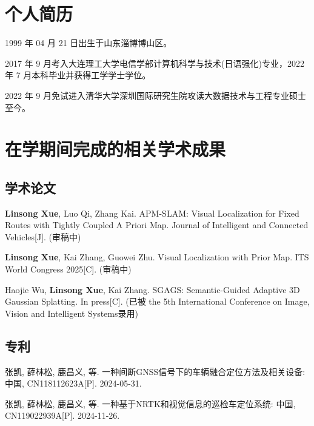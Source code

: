 
\begin{resume}

  \section*{个人简历}

  1999 年 04 月 21 日出生于山东淄博博山区。

  2017 年 9 月考入大连理工大学电信学部计算机科学与技术(日语强化)专业，2022 年 7 月本科毕业并获得工学学士学位。

  2022 年 9 月免试进入清华大学深圳国际研究生院攻读大数据技术与工程专业硕士至今。


  \section*{在学期间完成的相关学术成果}

  \subsection*{学术论文}

  \begin{achievements}
    \item \textbf{Linsong Xue}, Luo Qi, Zhang Kai. APM-SLAM: Visual Localization for Fixed Routes with Tightly Coupled A Priori Map. Journal of Intelligent and Connected Vehicles[J]. (审稿中)
    \item \textbf{Linsong Xue}, Kai Zhang, Guowei Zhu. Visual Localization with Prior Map. ITS World Congress 2025[C]. (审稿中)
    \item Haojie Wu, \textbf{Linsong Xue}, Kai Zhang. SGAGS: Semantic-Guided Adaptive 3D Gaussian Splatting. In press[C]. (已被 the 5th International Conference on Image, Vision and Intelligent Systems录用)
  \end{achievements}


  \subsection*{专利}

  \begin{achievements}
    \item 张凯, 薛林松, 鹿昌义, 等. 一种间断GNSS信号下的车辆融合定位方法及相关设备: 中国, CN118112623A[P]. 2024-05-31.
    \item 张凯, 薛林松, 鹿昌义, 等. 一种基于NRTK和视觉信息的巡检车定位系统: 中国, CN119022939A[P]. 2024-11-26.
  \end{achievements}

\end{resume}
